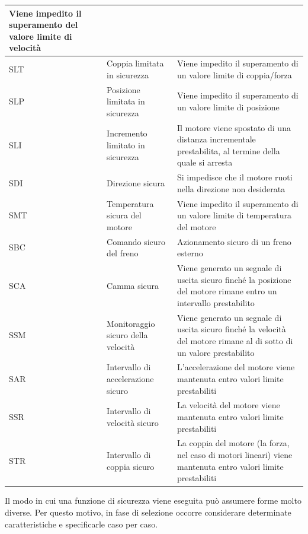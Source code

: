 \begin{longtable}{|p{1.8cm}|p{4.2cm}|p{\dimexpr\textwidth-6cm-6\tabcolsep-5\arrayrulewidth\relax}|}
    Viene impedito il superamento del valore limite di velocità \\
    \hline
    \rowcolor{black!8}
    SLT & Coppia limitata in sicurezza &
    Viene impedito il superamento di un valore limite di coppia/forza \\
    \hline
    SLP & Posizione limitata in sicurezza &
    Viene impedito il superamento di un valore limite di posizione \\
    \hline
    \rowcolor{black!8}
    SLI & Incremento limitato in sicurezza &
    Il motore viene spostato di una distanza incrementale prestabilita, al termine della quale si arresta \\
    \hline
    SDI & Direzione sicura &
    Si impedisce che il motore ruoti nella direzione non desiderata \\
    \hline
    \rowcolor{black!8}
    SMT & Temperatura sicura del motore &
    Viene impedito il superamento di un valore limite di temperatura del motore \\
    \hline
    SBC & Comando sicuro del freno &
    Azionamento sicuro di un freno esterno \\
    \hline
    \rowcolor{black!8}
    SCA & Camma sicura &
    Viene generato un segnale di uscita sicuro finché la posizione del motore rimane entro un intervallo prestabilito \\
    \hline
    SSM & Monitoraggio sicuro della velocità &
    Viene generato un segnale di uscita sicuro finché la velocità del motore rimane al di sotto di un valore prestabilito \\
    \hline
    \rowcolor{black!8}
    SAR & Intervallo di accelerazione sicuro &
    L'accelerazione del motore viene mantenuta entro valori limite prestabiliti \\
    \hline
    SSR & Intervallo di velocità sicuro &
    La velocità del motore viene mantenuta entro valori limite prestabiliti \\
    \hline
    \rowcolor{black!8}
    STR & Intervallo di coppia sicuro &
    La coppia del motore (la forza, nel caso di motori lineari) viene mantenuta entro valori limite prestabiliti \\
    \hline
\end{longtable}
\endgroup

Il modo in cui una funzione di sicurezza viene eseguita può assumere forme molto diverse. Per questo motivo, in fase di selezione occorre considerare determinate caratteristiche e specificarle caso per caso.

